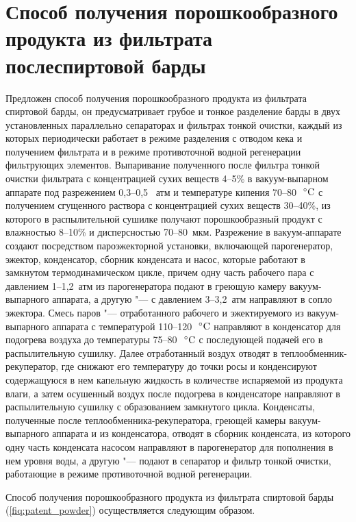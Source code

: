 \section{Способ получения порошкообразного продукта из фильтрата послеспиртовой барды}

Предложен способ получения порошкообразного продукта из фильтрата спиртовой барды, он предусматривает грубое и тонкое разделение барды в двух установленных параллельно сепараторах и фильтрах тонкой очистки, каждый из которых периодически работает в режиме разделения с отводом кека и получением фильтрата и в режиме противоточной водной регенерации фильтрующих элементов.
Выпаривание полученного после фильтра тонкой очистки фильтрата с концентрацией сухих веществ 4--5\% в вакуум-выпарном аппарате под разрежением 0,3--0,5~ атм и температуре кипения 70--80~\(\,^{\circ}\mathrm{C}\) с получением сгущенного раствора с концентрацией сухих веществ 30--40\%, из которого в распылительной сушилке получают порошкообразный продукт с влажностью 8--10\% и дисперсностью 70--80~мкм.
Разрежение в вакуум-аппарате создают посредством пароэжекторной установки, включающей парогенератор, эжектор, конденсатор, сборник конденсата и насос, которые работают в замкнутом термодинамическом цикле, причем одну часть рабочего пара с давлением 1--1,2~атм из парогенератора подают в греющую камеру вакуум-выпарного аппарата, а другую "--- с давлением 3--3,2~атм направляют в сопло эжектора.
Смесь паров "--- отработанного рабочего и эжектируемого из вакуум-выпарного аппарата с температурой 110--120~\(\,^{\circ}\mathrm{C}\) направляют в конденсатор для подогрева воздуха до температуры 75--80~\(\,^{\circ}\mathrm{C}\) с последующей подачей его в распылительную сушилку.
Далее отработанный воздух отводят в теплообменник-рекуператор, где снижают его температуру до точки росы и конденсируют содержащуюся в нем капельную жидкость в количестве испаряемой из продукта влаги, а затем осушенный воздух после подогрева в конденсаторе направляют в распылительную сушилку с образованием замкнутого цикла.
Конденсаты, полученные после теплообменника-рекуператора, греющей камеры вакуум-выпарного аппарата и из конденсатора, отводят в сборник конденсата, из которого одну часть конденсата насосом направляют в парогенератор для пополнения в нем уровня воды, а другую "--- подают в сепаратор и фильтр тонкой очистки, работающие в режиме противоточной водной регенерации.


Способ получения порошкообразного продукта из фильтрата спиртовой барды (\cref{fiq:patent_powder})
осуществляется следующим образом.

